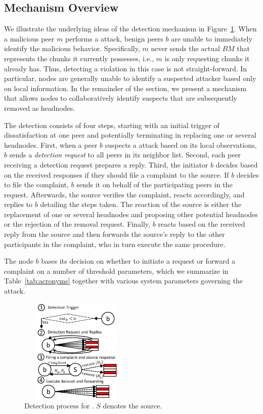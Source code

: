\subsection{Mechanism Overview}
We illustrate the underlying ideas of the detection mechanism in Figure~\ref{detection-blocks}.
When a malicious peer $m$ performs a \drop attack, benign peers $b$ are unable to immediately identify the malicious behavior.
Specifically, $m$ never sends the actual $BM$ that represents the chunks it currently possesses, i.e., $m$ is only requesting chunks it already has. 
Thus, detecting a violation in this case is not straight-forward. In particular, nodes are generally unable to identify a suspected attacker based only on local information.
In the remainder of the section, we present a mechanism that allows nodes to collaboratively identify suspects that are subsequently removed as headnodes.  


The detection consists of four steps, starting with an initial trigger of dissatisfaction at one peer and potentially terminating in replacing one or several headnodes. 
First, when a peer $b$ suspects a \drop attack based on its local observations, $b$ sends a \emph{detection request} to all peers in its neighbor list.
Second, each peer receiving a detection request prepares a reply. 
Third, the initiator $b$ decides based on the received responses if they should file a complaint to the source. 
If $b$ decides to file the complaint, $b$ sends it on behalf of the participating peers in the request. 
Afterwards, the source verifies the complaint, reacts accordingly, and replies to $b$ detailing the steps taken. 
The reaction of the source is either the replacement of one or several headnodes and proposing other potential headnodes or the rejection of the removal request.
Finally, $b$ reacts based on the received reply from the source and then forwards the source's reply to the other participants in the complaint, who in turn execute the same procedure.

The node $b$ bases its decision on whether to initiate a request or forward a complaint on a number of threshold parameters, which we summarize in Table~\ref{tab:acronyms} together with various system parameters governing the attack. 




\begin{figure}
 \centering
 \includegraphics[width=5.5cm,height=5cm]{./Figures/detection.pdf}
 
  \caption{Detection process for \drop. $S$ denotes the source.}
  \vspace{-4.5mm}
\label{detection-blocks} 
\end{figure}


